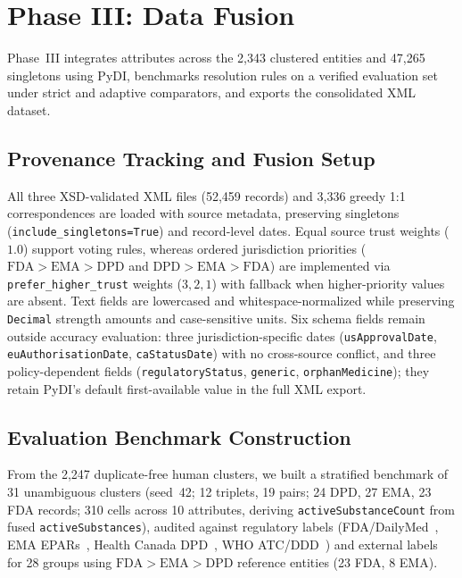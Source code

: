 \documentclass{llncs}
\begin{document}
\section{Phase III: Data Fusion}
\label{sec:data_fusion}

Phase~III integrates attributes across the 2,343 clustered entities and 47,265 singletons using PyDI, benchmarks resolution rules on a verified evaluation set under strict and adaptive comparators, and exports the consolidated XML dataset.

\subsection{Provenance Tracking and Fusion Setup}
All three XSD-validated XML files (52,459 records) and 3,336 greedy 1:1 correspondences are loaded with source metadata, preserving singletons (\texttt{include\_singletons=True}) and record-level dates. Equal source trust weights ($1.0$) support voting rules, whereas ordered jurisdiction priorities ($\text{FDA}>\text{EMA}>\text{DPD}$ and $\text{DPD}>\text{EMA}>\text{FDA}$) are implemented via \texttt{prefer\_higher\_trust} weights ($3, 2, 1$) with fallback when higher-priority values are absent. Text fields are lowercased and whitespace-normalized while preserving \texttt{Decimal} strength amounts and case-sensitive units. Six schema fields remain outside accuracy evaluation: three jurisdiction-specific dates (\texttt{usApprovalDate}, \texttt{euAuthorisationDate}, \texttt{caStatusDate}) with no cross-source conflict, and three policy-dependent fields (\texttt{regulatoryStatus}, \texttt{generic}, \texttt{orphanMedicine}); they retain PyDI's default first-available value in the full XML export.

\subsection{Evaluation Benchmark Construction}
From the 2,247 duplicate-free human clusters, we built a stratified benchmark of 31 unambiguous clusters (seed~42; 12 triplets, 19 pairs; 24 DPD, 27 EMA, 23 FDA records; 310 cells across 10 attributes, deriving \texttt{activeSubstanceCount} from fused \texttt{activeSubstances}), audited against regulatory labels (FDA/DailyMed~\cite{fda_drugsatfda}, EMA EPARs~\cite{ema_medicines}, Health Canada DPD~\cite{healthcanada_dpd}, WHO ATC/DDD~\cite{whocc_atc}) and external labels for 28 groups using $\text{FDA}>\text{EMA}>\text{DPD}$ reference entities (23 FDA, 8 EMA).
\end{document}
